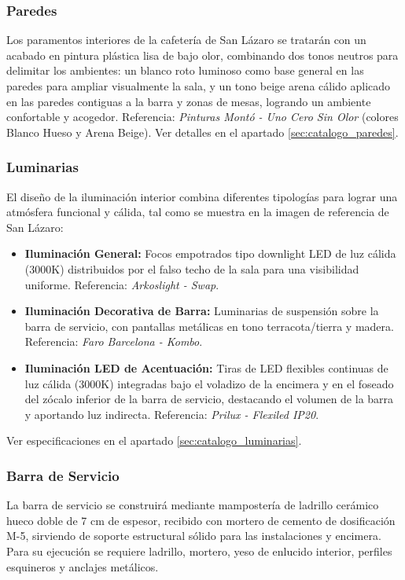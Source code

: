 \documentclass[12pt,a4paper]{article}
\begin{document}
\subsubsection{Paredes}
Los paramentos interiores de la cafetería de San Lázaro se tratarán con un acabado en pintura plástica lisa de bajo olor, combinando dos tonos neutros para delimitar los ambientes: un blanco roto luminoso como base general en las paredes para ampliar visualmente la sala, y un tono beige arena cálido aplicado en las paredes contiguas a la barra y zonas de mesas, logrando un ambiente confortable y acogedor. Referencia: \textit{Pinturas Montó - Uno Cero Sin Olor} (colores Blanco Hueso y Arena Beige). Ver detalles en el apartado \ref{sec:catalogo_paredes}.

\subsubsection{Luminarias}
El diseño de la iluminación interior combina diferentes tipologías para lograr una atmósfera funcional y cálida, tal como se muestra en la imagen de referencia de San Lázaro:
\begin{itemize}
    \item \textbf{Iluminación General:} Focos empotrados tipo downlight LED de luz cálida (3000K) distribuidos por el falso techo de la sala para una visibilidad uniforme. Referencia: \textit{Arkoslight - Swap}.
    \item \textbf{Iluminación Decorativa de Barra:} Luminarias de suspensión sobre la barra de servicio, con pantallas metálicas en tono terracota/tierra y madera. Referencia: \textit{Faro Barcelona - Kombo}.
    \item \textbf{Iluminación LED de Acentuación:} Tiras de LED flexibles continuas de luz cálida (3000K) integradas bajo el voladizo de la encimera y en el foseado del zócalo inferior de la barra de servicio, destacando el volumen de la barra y aportando luz indirecta. Referencia: \textit{Prilux - Flexiled IP20}.
\end{itemize}
Ver especificaciones en el apartado \ref{sec:catalogo_luminarias}.

\subsubsection{Barra de Servicio}
La barra de servicio se construirá mediante mampostería de ladrillo cerámico hueco doble de 7 cm de espesor, recibido con mortero de cemento de dosificación M-5, sirviendo de soporte estructural sólido para las instalaciones y encimera. Para su ejecución se requiere ladrillo, mortero, yeso de enlucido interior, perfiles esquineros y anclajes metálicos. 
\end{document}
